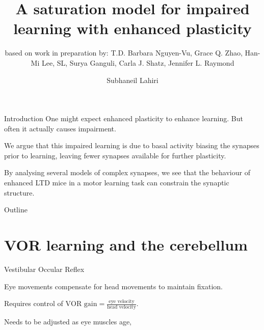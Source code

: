 \documentclass{beamer}%
\title[Saturation by enh. plasticity impairs learning]{A saturation model for impaired learning with enhanced plasticity}
\subtitle{\small{based on work in preparation by: T.D. Barbara Nguyen-Vu, Grace Q. Zhao, Han-Mi Lee, SL, Surya Ganguli, Carla J. Shatz, Jennifer L. Raymond
}}
\author{Subhaneil Lahiri%
}
\institute[Stanford]{%
Stanford University, Applied Physics
}
\begin{document}

\begin{frame}
%
 \titlepage
%
\end{frame}


\begin{frame}{Introduction}
%
 One might expect enhanced plasticity to enhance learning.
 But often it actually causes impairment.
 
 \vp We argue that this impaired learning is due to basal activity biasing the synapses prior to learning, leaving fewer synapses available for further plasticity.
 
 \vp By analysing several models of complex synapses, we see that the behaviour of enhanced LTD mice in a motor learning task can constrain the synaptic structure.
%
\end{frame}


\begin{frame}{Outline}
%
 \tableofcontents[hideallsubsections]
%
\end{frame}



\section{VOR learning and the cerebellum}


\begin{frame}{Vestibular Occular Reflex}
%
 \parbox[t]{0.4\linewidth}{}
 \parbox[t]{0.59\linewidth}{%
 Eye movements compensate for head movements to maintain fixation.

 \vp Requires control of $\text{VOR gain} = \frac{\text{eye velocity}}{\text{head velocity}}$.

 \vp Needs to be adjusted as eye muscles age, \etc
 }
 
%
\end{frame}
\end{document}
